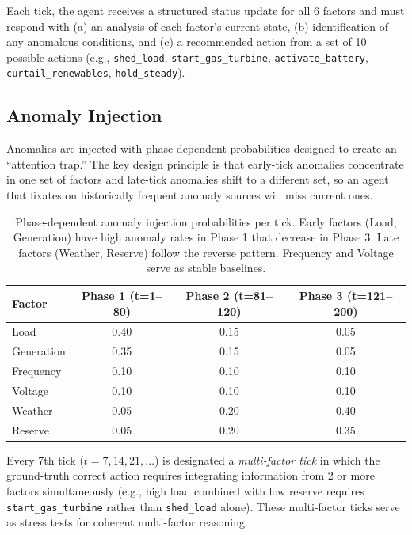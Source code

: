 \documentclass{article}
\begin{document}
Each tick, the agent receives a structured status update for all 6
factors and must respond with (a) an analysis of each factor's current
state, (b) identification of any anomalous conditions, and (c) a
recommended action from a set of 10 possible actions (e.g.,
\texttt{shed\_load}, \texttt{start\_gas\_turbine},
\texttt{activate\_battery}, \texttt{curtail\_renewables},
\texttt{hold\_steady}).

\subsection{Anomaly Injection}
\label{sec:anomaly_injection}

Anomalies are injected with phase-dependent probabilities designed to
create an ``attention trap.'' The key design principle is that early-tick
anomalies concentrate in one set of factors and late-tick anomalies shift
to a different set, so an agent that fixates on historically frequent
anomaly sources will miss current ones.

\begin{table}[h]
\centering
\caption{Phase-dependent anomaly injection probabilities per tick. Early
factors (Load, Generation) have high anomaly rates in Phase 1 that
decrease in Phase 3. Late factors (Weather, Reserve) follow the reverse
pattern. Frequency and Voltage serve as stable baselines.}
\label{tab:anomaly_schedule}
\begin{tabular}{@{}lccc@{}}
\toprule
\textbf{Factor} & \textbf{Phase 1 (t=1--80)} & \textbf{Phase 2
(t=81--120)} & \textbf{Phase 3 (t=121--200)} \\
\midrule
Load          & 0.40 & 0.15 & 0.05 \\
Generation    & 0.35 & 0.15 & 0.05 \\
Frequency     & 0.10 & 0.10 & 0.10 \\
Voltage       & 0.10 & 0.10 & 0.10 \\
Weather       & 0.05 & 0.20 & 0.40 \\
Reserve       & 0.05 & 0.20 & 0.35 \\
\bottomrule
\end{tabular}
\end{table}

Every 7th tick ($t = 7, 14, 21, \ldots$) is designated a
\emph{multi-factor tick} in which the ground-truth correct action
requires integrating information from 2 or more factors simultaneously
(e.g., high load combined with low reserve requires
\texttt{start\_gas\_turbine} rather than \texttt{shed\_load} alone).
These multi-factor ticks serve as stress tests for coherent multi-factor
reasoning.
\end{document}
